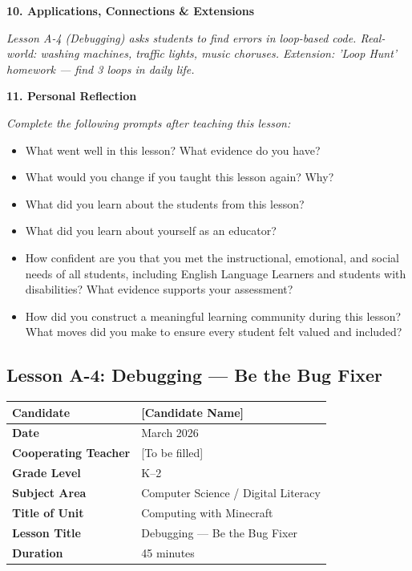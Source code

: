 \documentclass[11pt,letterpaper]{article}
\begin{document}
\textbf{10. Applications, Connections \& Extensions}

\textit{Lesson A-4 (Debugging) asks students to find errors in loop-based code. Real-world: washing machines, traffic lights, music choruses. Extension: 'Loop Hunt' homework --- find 3 loops in daily life.}

\textbf{11. Personal Reflection}

\textit{Complete the following prompts after teaching this lesson:}

\begin{itemize}
  \item What went well in this lesson? What evidence do you have?

  \item What would you change if you taught this lesson again? Why?

  \item What did you learn about the students from this lesson?

  \item What did you learn about yourself as an educator?

  \item How confident are you that you met the instructional, emotional, and social needs of all students, including English Language Learners and students with disabilities? What evidence supports your assessment?

  \item How did you construct a meaningful learning community during this lesson? What moves did you make to ensure every student felt valued and included?
\end{itemize}

\newpage
\subsection{Lesson A-4: Debugging --- Be the Bug Fixer}
\label{sub:LessonA4DebuggingBetheBugFixer}

\begin{longtable}{|L{0.28\textwidth}|L{0.65\textwidth}|}
\hline
\textbf{Candidate}  & [Candidate Name]  \\
\hline
\textbf{Date}  & March 2026  \\
\hline
\textbf{Cooperating Teacher}  & [To be filled]  \\
\hline
\textbf{Grade Level}  & K--2  \\
\hline
\textbf{Subject Area}  & Computer Science / Digital Literacy  \\
\hline
\textbf{Title of Unit}  & Computing with Minecraft  \\
\hline
\textbf{Lesson Title}  & Debugging --- Be the Bug Fixer  \\
\hline
\textbf{Duration}  & 45 minutes  \\
\hline
\end{longtable}
\end{document}
